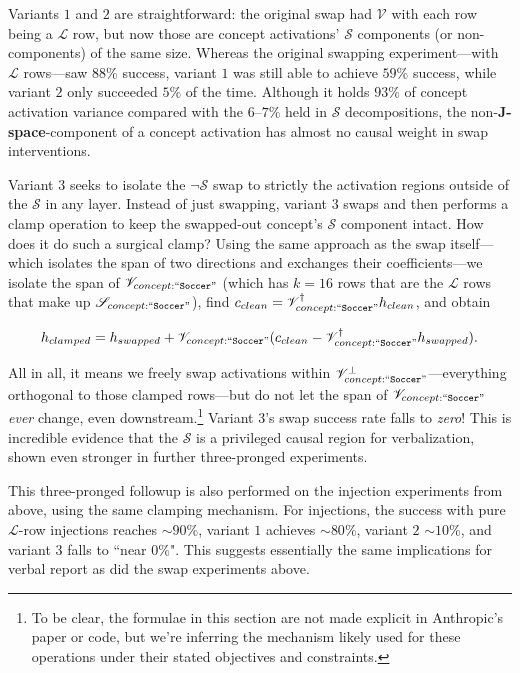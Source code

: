 \documentclass{article}
\newcommand{\jlens}{\mathscr{L}}
\newcommand{\jspace}{\mathscr{S}}
\begin{document}
Variants \(1\) and \(2\) are straightforward: the original swap had \(\mathscr{V}\) with each row being a \(\jlens\) row, but now those are concept activations' \(\jspace\) components (or non-components) of the same size. Whereas the original swapping experiment---with \(\jlens\) rows---saw \(88\%\) success, variant \(1\) was still able to achieve \(59\%\) success, while variant \(2\) only succeeded \(5\%\) of the time. Although it holds \(93\%\) of concept activation variance compared with the \(6\text{--}7\%\) held in \(\jspace\) decompositions, the non-\textbf{J-space}-component of a concept activation has almost no causal weight in swap interventions. 

Variant \(3\) seeks to isolate the \(\neg\jspace\) swap to strictly the activation regions outside of the \(\jspace\) in any layer. Instead of just swapping, variant \(3\) swaps and then performs a clamp operation to keep the swapped-out concept's \(\jspace\) component intact. How does it do such a surgical clamp? Using the same approach as the swap itself---which isolates the span of two directions and exchanges their coefficients---we isolate the span of \(\mathscr{V}_{{concept:``\texttt{Soccer}"}}\) (which has \(k = 16\) rows that are the \(\jlens\) rows that make up \(\jspace_{concept:``\texttt{Soccer}"}\)), find \(c_{clean} = \mathscr{V}_{{concept:``\texttt{Soccer}"}}^\dagger h_{clean}\), and obtain 

\[h_{clamped} = h_{swapped} + \mathscr{V}_{{concept:``\texttt{Soccer}"}} (c_{clean} - \mathscr{V}_{{concept:``\texttt{Soccer}"}}^\dagger h_{swapped}).\]

All in all, it means we freely swap activations within \(\mathscr{V}_{{concept:``\texttt{Soccer}"}}^{\perp}\)---everything orthogonal to those clamped rows---but do not let the span of \(\mathscr{V}_{{concept:``\texttt{Soccer}"}}\) \textit{ever} change, even downstream.\footnote{To be clear, the formulae in this section are not made explicit in Anthropic's paper or code, but we're inferring the mechanism likely used for these operations under their stated objectives and constraints.} Variant \(3\)'s swap success rate falls to \textit{zero}! This is incredible evidence that the \(\jspace\) is a privileged causal region for verbalization, shown even stronger in further three-pronged experiments.

This three-pronged followup is also performed on the injection experiments from above, using the same clamping mechanism. For injections, the success with pure \(\jlens\)-row injections reaches \(\sim90\%\), variant \(1\) achieves \(\sim80\%\), variant \(2\)  \(\sim10\%\), and variant \(3\) falls to ``near \(0\%\)". This suggests essentially the same implications for verbal report as did the swap experiments above. 
\end{document}
